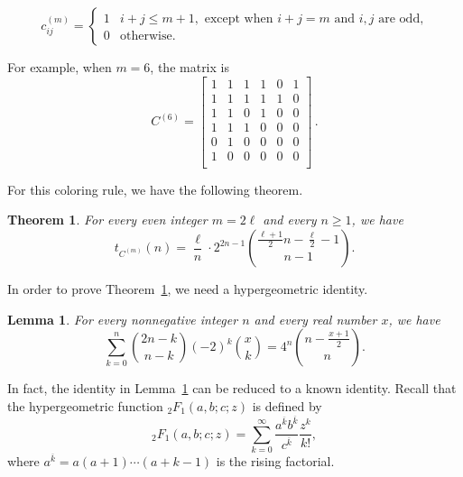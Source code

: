 \documentclass[12pt]{amsart}
\newtheorem{lemma}{Lemma}
\newtheorem{theorem}{Theorem}
\begin{document}
$$c_{ij}^{(m)} = \begin{cases} 1 & i+j \leq m+1, \text{ except when } i+j = m \text{ and } i,j \text{ are odd,} \\ 0 & \text{otherwise.} \end{cases}$$

For example, when $m=6$, the matrix is
$$C^{(6)} = \begin{bmatrix}
    1 & 1 & 1 & 1 & 0 & 1 \\
    1 & 1 & 1 & 1 & 1 & 0 \\
    1 & 1 & 0 & 1 & 0 & 0 \\
    1 & 1 & 1 & 0 & 0 & 0 \\
    0 & 1 & 0 & 0 & 0 & 0 \\
    1 & 0 & 0 & 0 & 0 & 0 \\
\end{bmatrix}\,.$$

For this coloring rule, we have the following theorem.

\begin{theorem}\label{thm:kplane-variant}
For every even integer $m = 2\ell$ and every $n \geq 1$, we have $$t_{C^{(m)}}(n) = \frac{\ell}{n} \cdot 2^{2n-1} \binom{\frac{\ell+1}{2} n - \frac{\ell}{2}-1}{n-1}.$$
\end{theorem}

In order to prove Theorem~\ref{thm:kplane-variant}, we need a hypergeometric identity.
\begin{lemma}\label{lem:hyper}
For every nonnegative integer $n$ and every real number $x$, we have
$$\sum_{k=0}^n \binom{2n-k}{n-k} (-2)^k \binom{x}{k} = 4^n \binom{n-\frac{x+1}{2}}{n}.$$
\end{lemma}

In fact, the identity in Lemma~\ref{lem:hyper} can be reduced to a known identity. Recall that the hypergeometric function ${}_2F_1(a,b;c;z)$ is defined by
$${}_2F_1(a,b;c;z) = \sum_{k=0}^{\infty}
\frac{a^{\overline{k}}b^{\overline{k}}}{c^{\overline{k}}} \frac{z^k}{k!},$$
where $a^{\overline{k}} = a(a+1)\cdots(a+k-1)$ is the rising factorial.
\end{document}
